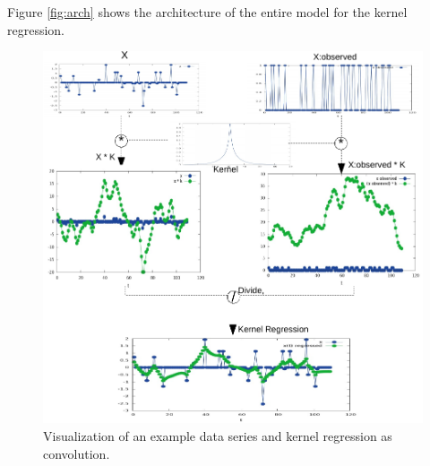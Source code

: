 \documentclass{article} %
\begin{document}
Figure \ref{fig:arch} shows the architecture of the entire model for the kernel regression.

\begin{figure}[h]
\begin{center}
\includegraphics[width=\textwidth]{img/formulation-crop.pdf}
\end{center}
\caption{Visualization of an example data series and kernel regression as convolution.}\label{fig:formulation}
\end{figure}
\end{document}
